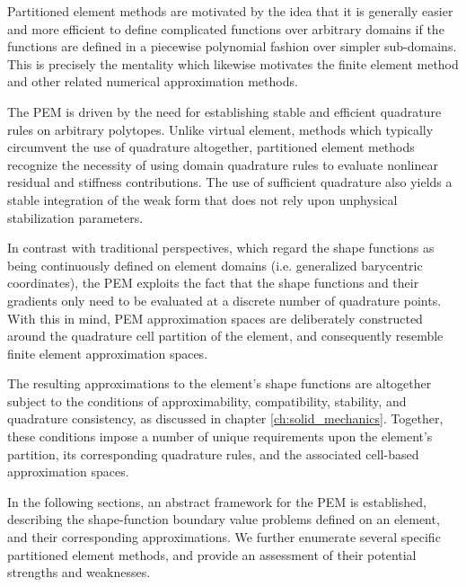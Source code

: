 Partitioned element methods are motivated by the idea that it is generally easier and more efficient to define complicated functions over arbitrary domains if the functions are defined in a piecewise polynomial fashion over simpler sub-domains. This is precisely the mentality which likewise motivates the finite element method and other related numerical approximation methods.

The PEM is driven by the need for establishing stable and efficient quadrature rules on arbitrary polytopes. Unlike virtual element, methods which typically circumvent the use of quadrature altogether, partitioned element methods recognize the necessity of using domain quadrature rules to evaluate nonlinear residual and stiffness contributions. The use of sufficient quadrature also yields a stable integration of the weak form that does not rely upon unphysical stabilization parameters.

In contrast with traditional perspectives, which regard the shape functions as being continuously defined on element domains (i.e. generalized barycentric coordinates), the PEM exploits the fact that the shape functions and their gradients only need to be evaluated at a discrete number of quadrature points. With this in mind, PEM approximation spaces are deliberately constructed around the quadrature cell partition of the element, and consequently resemble finite element approximation spaces.

The resulting approximations to the element's shape functions are altogether subject to the conditions of approximability, compatibility, stability, and quadrature consistency, as discussed in chapter \ref{ch:solid_mechanics}. Together, these conditions impose a number of unique requirements upon the element's partition, its corresponding quadrature rules, and the associated cell-based approximation spaces.

In the following sections, an abstract framework for the PEM is established, describing the shape-function boundary value problems defined on an element, and their corresponding approximations. We further enumerate several specific partitioned element methods, and provide an assessment of their potential strengths and weaknesses.


